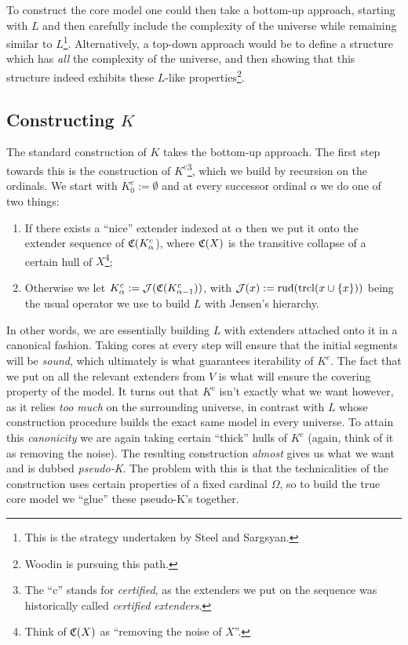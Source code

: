 \documentclass[../../main]{subfiles}
\begin{document}
\qquad To construct the core model one could then take a bottom-up approach, starting with $L$ and then carefully include the complexity of the universe while remaining similar to $L$\footnote{This is the strategy undertaken by Steel and Sargsyan.}. Alternatively, a top-down approach would be to define a structure which has \textit{all} the complexity of the universe, and then showing that this structure indeed exhibits these $L$-like properties\footnote{Woodin is pursuing this path.}.

\subsection{Constructing $K$}

The standard construction of $K$ takes the bottom-up approach. The first step towards this is the construction of $K^c$\footnote{The ``c'' stands for \textit{certified}, as the extenders we put on the sequence was historically called \textit{certified extenders}.}, which we build by recursion on the ordinals. We start with $K^c_0 := \emptyset$ and at every successor ordinal $\alpha$ we do one of two things:

\begin{enumerate}
  \item If there exists a ``nice'' extender indexed at $\alpha$ then we put it onto the extender sequence of $\mathfrak C(K^c_\alpha$), where $\mathfrak C(X)$ is the transitive collapse of a certain hull of $X$\footnote{Think of $\mathfrak C(X)$ as ``removing the noise of $X$''.};
  \item Otherwise we let $K^c_\alpha := \operatorname{\mathcal J}(\mathfrak C(K^c_{\alpha-1}))$, with $\operatorname{\mathcal J}(x):=\text{rud}(\operatorname{trcl}(x\cup\{x\}))$ being the usual operator we use to build $L$ with Jensen's hierarchy.\\
\end{enumerate}

In other words, we are essentially building $L$ with extenders attached onto it in a canonical fashion. Taking cores at every step will ensure that the initial segments will be \textit{sound}, which ultimately is what guarantees iterability of $K^c$. The fact that we put on all the relevant extenders from $V$ is what will ensure the covering property of the model. It turns out that $K^c$ isn't exactly what we want however, as it relies \textit{too much} on the surrounding universe, in contrast with $L$ whose construction procedure builds the exact same model in every universe. To attain this \textit{canonicity} we are again taking certain ``thick'' hulls of $K^c$ (again, think of it as removing the noise). The resulting construction \textit{almost} gives us what we want and is dubbed \textit{pseudo-K}. The problem with this is that the technicalities of the construction uses certain properties of a fixed cardinal $\Omega$, so to build the true core model we ``glue'' these pseudo-K's together.
\end{document}
